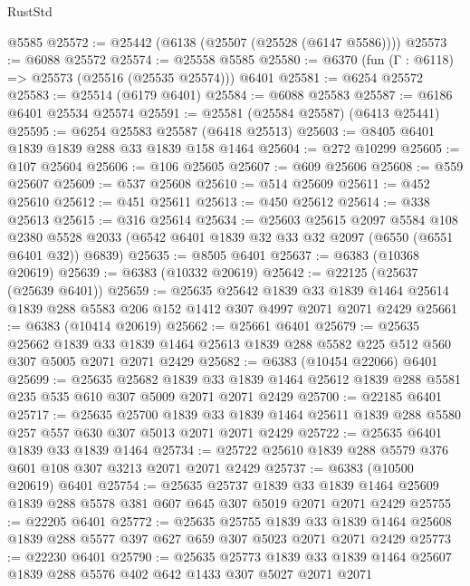 \begin{lexlean}{RustStd}
\begin{coremodule}
    @5585
@25572 := @25442 (@6138 (@25507 (@25528 (@6147 @5586))))
@25573 := @6088 @25572
@25574 := @25558 @5585
@25580 := @6370 (fun (Γ : @6118) => @25573 (@25516 (@25535 @25574))) @6401
@25581 := @6254 @25572
@25583 := @25514 (@6179 @6401)
@25584 := @6088 @25583
@25587 := @6186 @6401 @25534 @25574
@25591 := @25581 (@25584 @25587) (@6413 @25441)
@25595 := @6254 @25583 @25587 (@6418 @25513)
@25603 := @8405 @6401 @1839 @1839 @288 @33 @1839 @158 @1464
@25604 := @272 @10299
@25605 := @107 @25604
@25606 := @106 @25605
@25607 := @609 @25606
@25608 := @559 @25607
@25609 := @537 @25608
@25610 := @514 @25609
@25611 := @452 @25610
@25612 := @451 @25611
@25613 := @450 @25612
@25614 := @338 @25613
@25615 := @316 @25614
@25634 := @25603
    @25615
    @2097
    @5584
    @108
    @2380
    @5528
    @2033
    (@6542 @6401 @1839 @32 @33 @32 @2097 (@6550 (@6551 @6401 @32)) @6839)
@25635 := @8505 @6401
@25637 := @6383 (@10368 @20619)
@25639 := @6383 (@10332 @20619)
@25642 := @22125 (@25637 (@25639 @6401))
@25659 := @25635
    @25642
    @1839
    @33
    @1839
    @1464
    @25614
    @1839
    @288
    @5583
    @206
    @152
    @1412
    @307
    @4997
    @2071
    @2071
    @2429
@25661 := @6383 (@10414 @20619)
@25662 := @25661 @6401
@25679 := @25635
    @25662
    @1839
    @33
    @1839
    @1464
    @25613
    @1839
    @288
    @5582
    @225
    @512
    @560
    @307
    @5005
    @2071
    @2071
    @2429
@25682 := @6383 (@10454 @22066) @6401
@25699 := @25635
    @25682
    @1839
    @33
    @1839
    @1464
    @25612
    @1839
    @288
    @5581
    @235
    @535
    @610
    @307
    @5009
    @2071
    @2071
    @2429
@25700 := @22185 @6401
@25717 := @25635
    @25700
    @1839
    @33
    @1839
    @1464
    @25611
    @1839
    @288
    @5580
    @257
    @557
    @630
    @307
    @5013
    @2071
    @2071
    @2429
@25722 := @25635 @6401 @1839 @33 @1839 @1464
@25734 := @25722 @25610 @1839 @288 @5579 @376 @601 @108 @307 @3213 @2071 @2071 @2429
@25737 := @6383 (@10500 @20619) @6401
@25754 := @25635
    @25737
    @1839
    @33
    @1839
    @1464
    @25609
    @1839
    @288
    @5578
    @381
    @607
    @645
    @307
    @5019
    @2071
    @2071
    @2429
@25755 := @22205 @6401
@25772 := @25635
    @25755
    @1839
    @33
    @1839
    @1464
    @25608
    @1839
    @288
    @5577
    @397
    @627
    @659
    @307
    @5023
    @2071
    @2071
    @2429
@25773 := @22230 @6401
@25790 := @25635
    @25773
    @1839
    @33
    @1839
    @1464
    @25607
    @1839
    @288
    @5576
    @402
    @642
    @1433
    @307
    @5027
    @2071
    @2071

\end{coremodule}
\end{lexlean}
